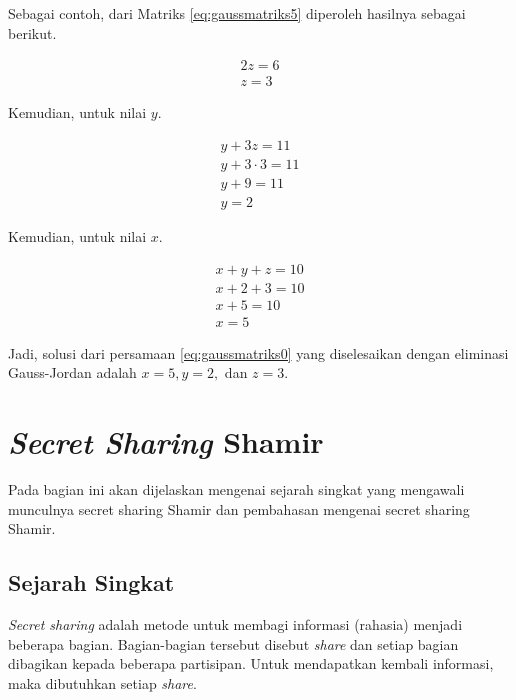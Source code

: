 Sebagai contoh, dari Matriks \ref{eq:gaussmatriks5} diperoleh hasilnya sebagai berikut.

\begin{gather}
	2z = 6 \nonumber \\
	z = 3 \label{eq:gaussmatriks6}
\end{gather}

Kemudian, untuk nilai \begin{math}y\end{math}.

\begin{gather}
	y + 3z = 11 \nonumber \\
	y + 3\cdot3 = 11 \nonumber \\
	y + 9 = 11 \nonumber \\
	y = 2 \label{eq:gaussmatriks7}
\end{gather}

Kemudian, untuk nilai \begin{math}x\end{math}.

\begin{gather}
	x + y + z = 10 \nonumber \\
	x + 2 + 3 = 10 \nonumber \\
	x + 5 = 10 \nonumber \\
	x = 5 \label{eq:gaussmatriks8}
\end{gather}

Jadi, solusi dari persamaan \ref{eq:gaussmatriks0} yang diselesaikan dengan eliminasi Gauss-Jordan adalah \begin{math}x=5, y=2,\end{math} dan \begin{math}z=3\end{math}.

\section{\textit{Secret Sharing} Shamir}\label{sec:secretsharingshamir}

Pada bagian ini akan dijelaskan mengenai sejarah singkat yang mengawali munculnya secret sharing Shamir dan pembahasan mengenai secret sharing Shamir.

\subsection{Sejarah Singkat}

\textit{Secret sharing} adalah metode untuk membagi informasi (rahasia) menjadi beberapa bagian. Bagian-bagian tersebut disebut \textit{share} dan setiap bagian dibagikan kepada beberapa partisipan. Untuk mendapatkan kembali informasi, maka dibutuhkan setiap \textit{share}.

